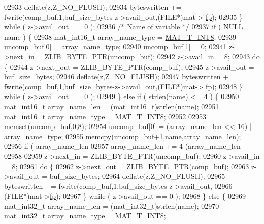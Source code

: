 \begin{DoxyCode}
{{{{{{{{{{{{{{{{02933         deflate(z,Z\_NO\_FLUSH);
02934         byteswritten += fwrite(comp\_buf,1,buf\_size\_bytes-z->avail\_out,(FILE*)mat->
      \hyperlink{struct__mat__t_a85f562e407ca9ad4d2a6e14f839432b7}{fp});
02935     \} \textcolor{keywordflow}{while} ( z->avail\_out == 0 );
02936     \textcolor{comment}{/* Name of variable */}
02937     \textcolor{keywordflow}{if} ( NULL == name ) \{
02938         mat\_int16\_t array\_name\_type = \hyperlink{group___m_a_t_ggacf7b3b879282b7ab3a51190e49bf3453a9807f5033ed4f9b548953742d9fd1658}{MAT\_T\_INT8};
02939         uncomp\_buf[0] = array\_name\_type;
02940         uncomp\_buf[1] = 0;
02941         z->next\_in  = ZLIB\_BYTE\_PTR(uncomp\_buf);
02942         z->avail\_in = 8;
02943         \textcolor{keywordflow}{do} \{
02944             z->next\_out  = ZLIB\_BYTE\_PTR(comp\_buf);
02945             z->avail\_out = buf\_size\_bytes;
02946             deflate(z,Z\_NO\_FLUSH);
02947             byteswritten += fwrite(comp\_buf,1,buf\_size\_bytes-z->avail\_out,(FILE*)mat->
      \hyperlink{struct__mat__t_a85f562e407ca9ad4d2a6e14f839432b7}{fp});
02948         \} \textcolor{keywordflow}{while} ( z->avail\_out == 0 );
02949     \} \textcolor{keywordflow}{else} \textcolor{keywordflow}{if} ( strlen(name) <= 4 ) \{
02950         mat\_int16\_t array\_name\_len = (mat\_int16\_t)strlen(name);
02951         mat\_int16\_t array\_name\_type = \hyperlink{group___m_a_t_ggacf7b3b879282b7ab3a51190e49bf3453a9807f5033ed4f9b548953742d9fd1658}{MAT\_T\_INT8};
02952 
02953         memset(uncomp\_buf,0,8);
02954         uncomp\_buf[0] = (array\_name\_len << 16) | array\_name\_type;
02955         memcpy(uncomp\_buf+1,name,array\_name\_len);
02956         \textcolor{keywordflow}{if} ( array\_name\_len %
02957             array\_name\_len += 4-(array\_name\_len %
02958 
02959         z->next\_in  = ZLIB\_BYTE\_PTR(uncomp\_buf);
02960         z->avail\_in = 8;
02961         \textcolor{keywordflow}{do} \{
02962             z->next\_out  = ZLIB\_BYTE\_PTR(comp\_buf);
02963             z->avail\_out = buf\_size\_bytes;
02964             deflate(z,Z\_NO\_FLUSH);
02965             byteswritten += fwrite(comp\_buf,1,buf\_size\_bytes-z->avail\_out,
02966                 (FILE*)mat->\hyperlink{struct__mat__t_a85f562e407ca9ad4d2a6e14f839432b7}{fp});
02967         \} \textcolor{keywordflow}{while} ( z->avail\_out == 0 );
02968     \} \textcolor{keywordflow}{else} \{
02969         mat\_int32\_t array\_name\_len = (mat\_int32\_t)strlen(name);
02970         mat\_int32\_t array\_name\_type = \hyperlink{group___m_a_t_ggacf7b3b879282b7ab3a51190e49bf3453a9807f5033ed4f9b548953742d9fd1658}{MAT\_T\_INT8};
}}}}}}}}}}}}}}}}
\end{DoxyCode}
